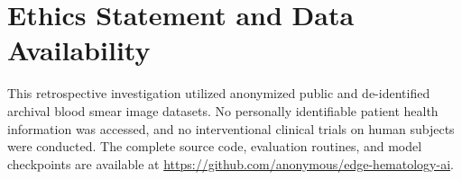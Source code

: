 \documentclass[10pt,conference]{IEEEtran}
\begin{document}
\section*{Ethics Statement and Data Availability}
This retrospective investigation utilized anonymized public and de-identified archival blood smear image datasets. No personally identifiable patient health information was accessed, and no interventional clinical trials on human subjects were conducted. The complete source code, evaluation routines, and model checkpoints are available at \url{https://github.com/anonymous/edge-hematology-ai}.

\balance


\end{document}
